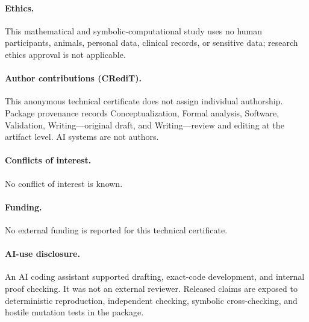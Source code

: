 \documentclass[10pt]{article}
\begin{document}
\paragraph{Ethics.}
This mathematical and symbolic-computational study uses no human
participants, animals, personal data, clinical records, or sensitive data;
research ethics approval is not applicable.
\paragraph{Author contributions (CRediT).}
This anonymous technical certificate does not assign individual authorship.
Package provenance records Conceptualization, Formal analysis, Software,
Validation, Writing---original draft, and Writing---review and editing at the
artifact level.  AI systems are not authors.
\paragraph{Conflicts of interest.}
No conflict of interest is known.
\paragraph{Funding.}
No external funding is reported for this technical certificate.
\paragraph{AI-use disclosure.}
An AI coding assistant supported drafting, exact-code development, and
internal proof checking.  It was not an external reviewer.  Released claims
are exposed to deterministic reproduction, independent checking, symbolic
cross-checking, and hostile mutation tests in the package.
\end{document}
